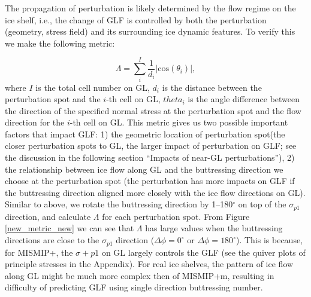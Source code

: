 \documentclass[review,oneside]{igs}
\begin{document}
The propagation of perturbation is likely determined by the flow regime on the ice shelf, i.e., the change of GLF is controlled by both the perturbation (geometry, stress field) and its surrounding ice dynamic features. To verify this we make the following metric:

\begin{equation}
    \Lambda = \sum_i^I \frac{1}{d_i} |\mathrm{cos} \left(\theta_i\right)|,
    \label{Lambda}
\end{equation}
where $I$ is the total cell number on GL, $d_i$ is the distance between the perturbation spot and the $i$-th cell on GL, $theta_i$ is the angle difference between the direction of the specified normal stress at the perturbation spot and the flow direction for the $i$-th cell on GL. This metric gives us two possible important factors that impact GLF: 1) the geometric location of perturbation spot(the closer perturbation spots to GL, the larger impact of perturbation on GLF; see the discussion in the following section ``Impacts of near-GL perturbations''), 2) the relationship between ice flow along GL and the buttressing direction we choose at the perturbation spot (the perturbation has more impacts on GLF if the buttressing direction aligned more closely with the ice flow directions on GL).  
Similar to above, we rotate the buttressing direction by 1--180$^\circ$ on top of the $\sigma_{p1}$ direction, and calculate $\Lambda$ for each perturbation spot. From Figure \ref{new_metric_new} we can see that $\Lambda$ has large values when the buttressing directions are close to the $\sigma_{p1}$ direction ($\Delta\phi=0^\circ$ or $\Delta\phi=180^\circ$). This is because, for MISMIP+, the $\sigma+{p1}$ on GL largely controls the GLF (see the quiver plots of principle stresses in the Appendix). For real ice shelves, the pattern of ice flow along GL might be much more complex then of MISMIP+m, resulting in difficulty of predicting GLF using single direction buttressing number.  
\end{document}
